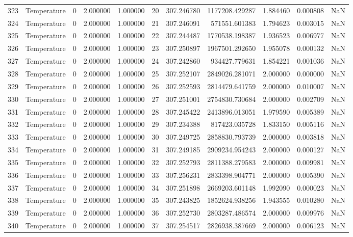 \begin{tabular}{llrrrrrrrrr}
323 & Temperature & 0 & 2.000000 & 1.000000 & 20 & 307.246780 & 1177208.429287 & 1.884460 & 0.000808 & NaN \\
324 & Temperature & 0 & 2.000000 & 1.000000 & 21 & 307.246091 & 571551.601383 & 1.794623 & 0.003015 & NaN \\
325 & Temperature & 0 & 2.000000 & 1.000000 & 22 & 307.244487 & 1770538.198387 & 1.936523 & 0.006977 & NaN \\
326 & Temperature & 0 & 2.000000 & 1.000000 & 23 & 307.250897 & 1967501.292650 & 1.955078 & 0.000132 & NaN \\
327 & Temperature & 0 & 2.000000 & 1.000000 & 24 & 307.242860 & 934427.779631 & 1.854221 & 0.001036 & NaN \\
328 & Temperature & 0 & 2.000000 & 1.000000 & 25 & 307.252107 & 2849026.281071 & 2.000000 & 0.000000 & NaN \\
329 & Temperature & 0 & 2.000000 & 1.000000 & 26 & 307.252593 & 2814479.641759 & 2.000000 & 0.010007 & NaN \\
330 & Temperature & 0 & 2.000000 & 1.000000 & 27 & 307.251001 & 2754830.730684 & 2.000000 & 0.002709 & NaN \\
331 & Temperature & 0 & 2.000000 & 1.000000 & 28 & 307.245422 & 2413896.013051 & 1.979590 & 0.005389 & NaN \\
332 & Temperature & 0 & 2.000000 & 1.000000 & 29 & 307.234388 & 817423.035728 & 1.833150 & 0.005116 & NaN \\
333 & Temperature & 0 & 2.000000 & 1.000000 & 30 & 307.249725 & 2858830.793739 & 2.000000 & 0.003818 & NaN \\
334 & Temperature & 0 & 2.000000 & 1.000000 & 31 & 307.249185 & 2909234.954243 & 2.000000 & 0.000127 & NaN \\
335 & Temperature & 0 & 2.000000 & 1.000000 & 32 & 307.252793 & 2811388.279583 & 2.000000 & 0.009981 & NaN \\
336 & Temperature & 0 & 2.000000 & 1.000000 & 33 & 307.256231 & 2833398.904771 & 2.000000 & 0.005390 & NaN \\
337 & Temperature & 0 & 2.000000 & 1.000000 & 34 & 307.251898 & 2669203.601148 & 1.992090 & 0.000023 & NaN \\
338 & Temperature & 0 & 2.000000 & 1.000000 & 35 & 307.243825 & 1852624.938256 & 1.943555 & 0.010280 & NaN \\
339 & Temperature & 0 & 2.000000 & 1.000000 & 36 & 307.252730 & 2803287.486574 & 2.000000 & 0.009976 & NaN \\
340 & Temperature & 0 & 2.000000 & 1.000000 & 37 & 307.254517 & 2826938.387669 & 2.000000 & 0.006123 & NaN \\

\end{tabular}
